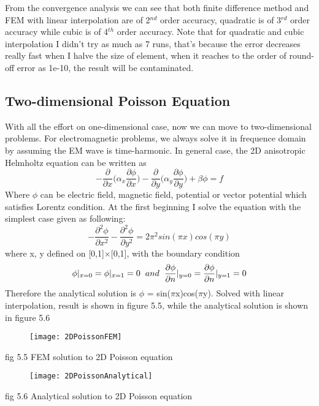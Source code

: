 \documentclass[journal]{IEEEtran}
\begin{document}
From the convergence analysis we can see that both finite difference method and FEM with linear interpolation are of 2$^{nd}$ order accuracy, quadratic is of 3$^{rd}$ order accuracy while cubic is of 4$^{th}$ order accuracy. Note that for quadratic and cubic interpolation I didn't try as much as 7 runs, that's because the error decreases really fast when I halve the size of element, when it reaches to the order of round-off error as 1e-10, the result will be contaminated. 

\subsection{Two-dimensional Poisson Equation}
With all the effort on one-dimensional case, now we can move to two-dimensional problems. For electromagnetic problems, we always solve it in frequence domain by assuming the EM wave is time-harmonic. In general case, the 2D anisotropic Helmholtz equation can be written as
\begin{equation}
-\frac{\partial}{\partial x} \bigg(\alpha_x \frac{\partial\phi}{\partial x}\bigg) -\frac{\partial}{\partial y} \bigg(\alpha_y \frac{\partial\phi}{\partial y}\bigg) + \beta \phi= f
\end{equation}
Where $\phi$ can be electric field, magnetic field, potential or vector potential which satisfies Lorentz condition. 
At the first beginning I solve the equation with the simplest case given as following:
\begin{equation}
-\frac{\partial^2 \phi}{\partial x^2}-\frac{\partial^2 \phi}{\partial y^2} = 2\pi^2 sin(\pi x)cos(\pi y)
\end{equation}
where x, y defined on [0,1]$\times$[0,1], with the boundary condition
\begin{align*}
\phi|_{x = 0} = \phi|_{x = 1} = 0 \hspace{0.2cm} and \hspace{0.2cm} \frac{\partial \phi}{\partial n}|_{y = 0} = \frac{\partial \phi}{\partial n}|_{y = 1} = 0
\end{align*}
Therefore the analytical solution is $\phi$ = sin($\pi$x)cos($\pi$y). Solved with linear interpolation, result is shown in figure 5.5, while the analytical solution is shown in figure 5.6
\begin{figure}[h]	
	\texttt{[image: 2DPoissonFEM]}
\end{figure}
\begin{center}
	\small fig 5.5 FEM solution to 2D Poisson equation 
\end{center} 
\begin{figure}[h]
	\texttt{[image: 2DPoissonAnalytical]}
\end{figure}
\begin{center}
	\small fig 5.6 Analytical solution to 2D Poisson equation
\end{center} 
\end{document}
